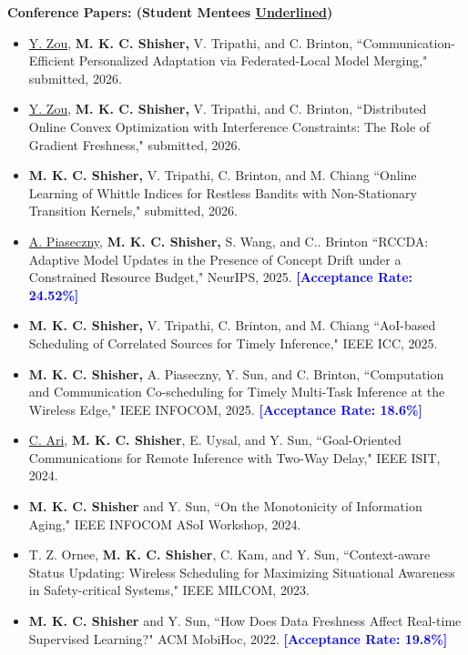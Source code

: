 \documentclass[letterpaper,11pt]{article}
\begin{document}
{\bf Conference Papers: (Student Mentees \underline{Underlined})}\\
\vspace{-5pt}
{\justifying
\begin{itemize}
 \setlength\itemsep{-2pt}
  \item[C12.] \underline{Y. Zou}, \textbf{M. K. C. Shisher,} V. Tripathi, and C. Brinton,
``Communication-Efficient Personalized Adaptation
via Federated-Local Model Merging," submitted, {2026}.
 \item[C11.] \underline{Y. Zou}, \textbf{M. K. C. Shisher,} V. Tripathi, and C. Brinton,
``Distributed Online Convex Optimization with Interference Constraints: The Role of Gradient Freshness," submitted, {2026}.
  \item[C10.] \textbf{M. K. C. Shisher,} V. Tripathi, C. Brinton, and M. Chiang
``Online Learning of Whittle Indices for Restless Bandits with Non-Stationary Transition Kernels," submitted, {2026}.
   \item[C9.] \underline{A. Piaseczny}, \textbf{M. K. C. Shisher,} S. Wang, and C.. Brinton
``RCCDA: Adaptive Model Updates in the Presence of Concept Drift under a Constrained Resource Budget," {NeurIPS, 2025}. \textcolor{blue}{\bf [Acceptance Rate: 24.52\%]}
 \item[C8.] \textbf{M. K. C. Shisher,} V. Tripathi, C. Brinton, and M. Chiang
``AoI-based Scheduling of Correlated Sources for Timely Inference," {IEEE ICC, 2025}.
\item[C7.] \textbf{M. K. C. Shisher,}  A. Piaseczny, Y. Sun, and C. Brinton, ``Computation and Communication Co-scheduling for Timely Multi-Task Inference at the Wireless Edge," {IEEE INFOCOM, 2025}. \textcolor{blue}{\bf [Acceptance Rate: 18.6\%]}
\item[C6.] \underline{C. Ari}, \textbf{M. K. C. Shisher}, E. Uysal, and Y. Sun,
``Goal-Oriented Communications for Remote Inference with Two-Way Delay," {IEEE ISIT, 2024}. 

\item[C5.] \textbf{M. K. C. Shisher} and Y. Sun,
``On the Monotonicity of Information Aging," {IEEE INFOCOM ASoI Workshop, 2024}.

\item[C4.] T. Z. Ornee, \textbf{M. K. C. Shisher}, C. Kam, and Y. Sun,
``Context-aware Status Updating: Wireless Scheduling for Maximizing Situational Awareness in Safety-critical Systems," {IEEE MILCOM, 2023}.

\item[C3.] \textbf{M. K. C. Shisher} and Y. Sun,
``How Does Data Freshness Affect Real-time Supervised Learning?" {ACM MobiHoc, 2022}. \textcolor{blue}{\bf [Acceptance Rate: 19.8\%]}


\end{itemize}}
\end{document}
